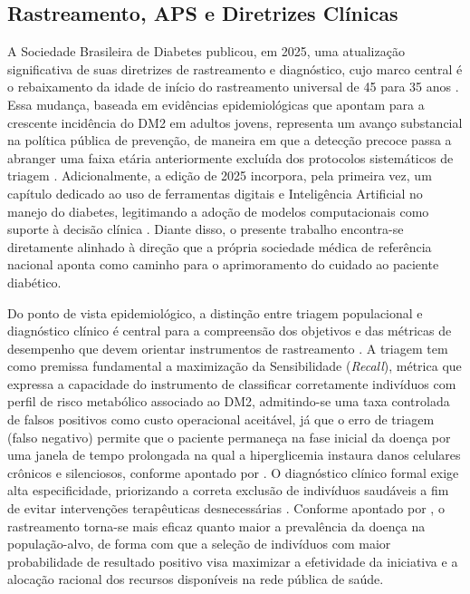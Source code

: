 \subsection{Rastreamento, APS e Diretrizes Clínicas}\label{sec:rastreamento-aps}
A Sociedade Brasileira de Diabetes publicou, em 2025, uma atualização significativa de suas diretrizes de rastreamento e diagnóstico, cujo marco central é o rebaixamento da idade de início do rastreamento universal de 45 para 35 anos \cite{Rodacki2025}. Essa mudança, baseada em evidências epidemiológicas que apontam para a crescente incidência do DM2 em adultos jovens, representa um avanço substancial na política pública de prevenção, de maneira em que a detecção precoce passa a abranger uma faixa etária anteriormente excluída dos protocolos sistemáticos de triagem \cite{SBD2025}. Adicionalmente, a edição de 2025 incorpora, pela primeira vez, um capítulo dedicado ao uso de ferramentas digitais e Inteligência Artificial no manejo do diabetes, legitimando a adoção de modelos computacionais como suporte à decisão clínica \cite{SBD2025}. Diante disso, o presente trabalho encontra-se diretamente alinhado à direção que a própria sociedade médica de referência nacional aponta como caminho para o aprimoramento do cuidado ao paciente diabético.

Do ponto de vista epidemiológico, a distinção entre triagem populacional e diagnóstico clínico é central para a compreensão dos objetivos e das métricas de desempenho que devem orientar instrumentos de rastreamento \cite{Swaminathan2024, Rodacki2025}. A triagem tem como premissa fundamental a maximização da Sensibilidade (\textit{Recall}), métrica que expressa a capacidade do instrumento de classificar corretamente indivíduos com perfil de risco metabólico associado ao DM2, admitindo-se uma taxa controlada de falsos positivos como custo operacional aceitável, já que o erro de triagem (falso negativo) permite que o paciente permaneça na fase inicial da doença por uma janela de tempo prolongada na qual a hiperglicemia instaura danos celulares crônicos e silenciosos, conforme apontado por \textcite{mlynarska2025type}. O diagnóstico clínico formal exige alta especificidade, priorizando a correta exclusão de indivíduos saudáveis a fim de evitar intervenções terapêuticas desnecessárias \cite{mlynarska2025type, ADA2010, SBD2025}. Conforme apontado por \textcite{Rodacki2025}, o rastreamento torna-se mais eficaz quanto maior a prevalência da doença na população-alvo, de forma com que a seleção de indivíduos com maior probabilidade de resultado positivo visa maximizar a efetividade da iniciativa e a alocação racional dos recursos disponíveis na rede pública de saúde.

